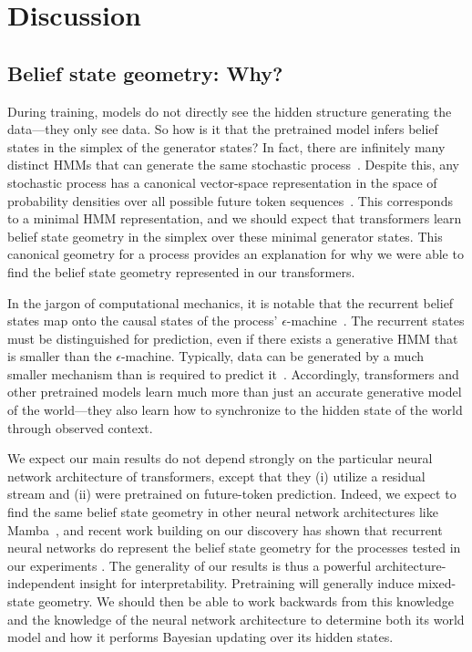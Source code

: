 \documentclass{article}
\begin{document}
\section{Discussion}
\label{sec:Discussion}

\subsection{Belief state geometry: Why? }

During training, models do not directly see the hidden structure generating the data---they only see data. So how is it that the pretrained model infers belief states in the simplex of the generator states? In fact, there are infinitely many distinct HMMs that can generate the same stochastic process~\citep{Crut10a}. Despite this, any stochastic process has a canonical vector-space representation in the space of probability densities over all possible future token sequences~\citep{Uppe97a}.
This corresponds to a minimal HMM representation, and we should expect
that transformers learn
belief state geometry in the simplex over these minimal generator states. This canonical geometry for a process provides an explanation for why we were able to find the belief state geometry represented in our transformers.

In the jargon of computational mechanics, it is notable that the recurrent belief states map onto the causal states
of the process' $\epsilon$-machine~\citep{Crut12a}. The recurrent states must be distinguished for prediction, even if there exists a generative HMM that is smaller than the $\epsilon$-machine.
Typically, data can be generated by a much smaller mechanism than is required to predict it~\cite{lohr2012predictive, ruebeck2018prediction}.
Accordingly, transformers and other pretrained models learn much more than just an accurate generative model of the world---they also learn how to synchronize to the hidden state of the world through observed context.

We expect our main results do not depend strongly on the particular neural network architecture of transformers, except that they (i) utilize a residual stream and (ii) were pretrained on future-token prediction.
Indeed, we expect to find the same belief state geometry in other neural network architectures like Mamba~\citep{Gu23_Mamba}, and recent work building on our discovery has shown that recurrent neural networks do represent the belief state geometry for the processes tested in our experiments \cite{rnn_belief}.
The generality of our results is thus a powerful architecture-independent insight for interpretability. Pretraining will generally induce mixed-state geometry. We should then be able to work backwards from this knowledge and the knowledge of the neural network architecture to determine both its world model and how it performs Bayesian updating over its hidden states.
\end{document}
